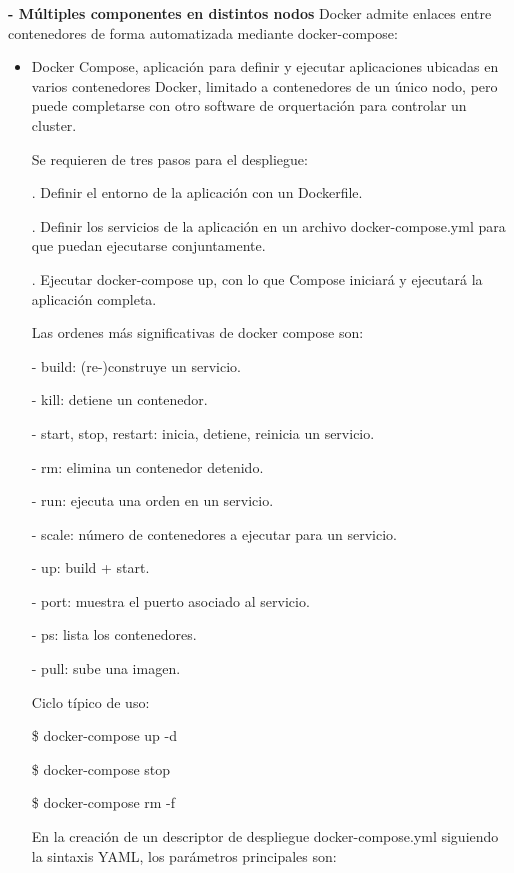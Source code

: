 \documentclass[12pt]{amsart}
\begin{document}
    {\bf - Múltiples componentes en distintos nodos} Docker admite enlaces entre contenedores de forma automatizada mediante docker-compose:
    
    \begin{itemize}
    
    \item Docker Compose, aplicación para definir y ejecutar aplicaciones ubicadas en varios contenedores Docker, limitado a contenedores de un único nodo, pero puede completarse con otro software de orquertación para controlar un cluster.
    
    Se requieren de tres pasos para el despliegue:
    
    . Definir el entorno de la aplicación con un Dockerfile.
    
    . Definir los  servicios de la aplicación en un archivo docker-compose.yml para que puedan ejecutarse conjuntamente.
    
    . Ejecutar  docker-compose  up,  con  lo que  Compose  iniciará  y ejecutará  la  aplicación completa.
    
    Las ordenes más significativas de docker compose son:
    
    \subitem - build: (re-)construye un servicio.
    
    \subitem - kill: detiene un contenedor.
    
    \subitem - start, stop, restart: inicia, detiene, reinicia un servicio.
    
    \subitem - rm: elimina un contenedor detenido.
    
    \subitem - run: ejecuta una orden en un servicio.
    
    \subitem - scale: número de contenedores a ejecutar para un servicio.
    
    \subitem - up: build + start.
    
    \subitem - port: muestra el puerto asociado al servicio.
    
    \subitem - ps: lista los contenedores.
    
    \subitem - pull: sube una imagen.
    
    Ciclo típico de uso:
    
    \subitem \$ docker-compose up -d
    
    \subitem \$ docker-compose stop
    
    \subitem \$ docker-compose rm -f
    
    En la creación de un descriptor de despliegue docker-compose.yml siguiendo la sintaxis YAML, los parámetros principales son:
    

\end{itemize}
\end{document}
